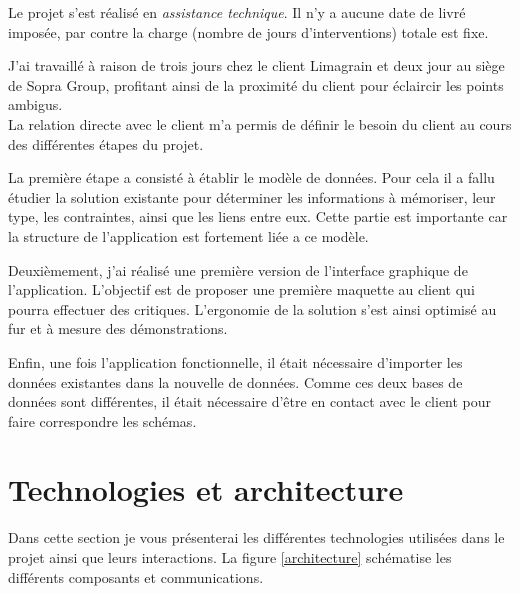 Le projet s'est réalisé en \textit{assistance technique}. Il n'y a aucune date de livré imposée, par contre la charge (nombre de jours d'interventions) totale est fixe.

J'ai travaillé à raison de trois jours chez le client Limagrain et deux jour au siège de Sopra Group, profitant ainsi de la proximité du client pour éclaircir les points ambigus.
\\

La relation directe avec le client m'a permis de définir le besoin du client au cours des différentes étapes du projet.

La première étape a consisté à établir le modèle de données. Pour cela il a fallu étudier la solution existante pour déterminer les informations à mémoriser, leur type, les contraintes, ainsi que les liens entre eux. Cette partie est importante car la structure de l'application est fortement liée a ce modèle.

Deuxièmement, j'ai réalisé une première version de l'interface graphique de l'application. L'objectif est de proposer une première maquette au client qui pourra effectuer des critiques. L'ergonomie de la solution s'est ainsi optimisé au fur et à mesure des démonstrations.

Enfin, une fois l'application fonctionnelle, il était nécessaire d'importer les données existantes dans la nouvelle de données. Comme ces deux bases de données sont différentes, il était nécessaire d'être en contact avec le client pour faire correspondre les schémas.


\section{Technologies et architecture}

Dans cette section je vous présenterai les différentes technologies utilisées dans le projet ainsi que leurs interactions. La figure \ref{architecture} schématise les différents composants et communications.
~~\\

